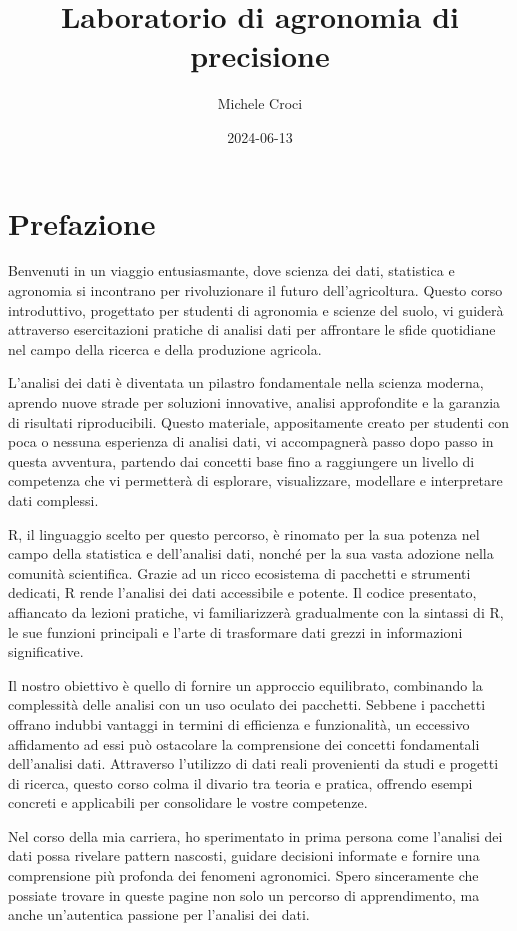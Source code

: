 \documentclass[
]{book}
\title{Laboratorio di agronomia di precisione}
\author{Michele Croci}
\date{2024-06-13}
\begin{document}
\frontmatter
\maketitle

\mainmatter
\hypertarget{prefazione}{%
\chapter{Prefazione}\label{prefazione}}

Benvenuti in un viaggio entusiasmante, dove scienza dei dati, statistica
e agronomia si incontrano per rivoluzionare il futuro dell'agricoltura.
Questo corso introduttivo, progettato per studenti di agronomia e
scienze del suolo, vi guiderà attraverso esercitazioni pratiche di
analisi dati per affrontare le sfide quotidiane nel campo della ricerca
e della produzione agricola.

L'analisi dei dati è diventata un pilastro fondamentale nella scienza
moderna, aprendo nuove strade per soluzioni innovative, analisi
approfondite e la garanzia di risultati riproducibili. Questo materiale,
appositamente creato per studenti con poca o nessuna esperienza di
analisi dati, vi accompagnerà passo dopo passo in questa avventura,
partendo dai concetti base fino a raggiungere un livello di competenza
che vi permetterà di esplorare, visualizzare, modellare e interpretare
dati complessi.

R, il linguaggio scelto per questo percorso, è rinomato per la sua
potenza nel campo della statistica e dell'analisi dati, nonché per la
sua vasta adozione nella comunità scientifica. Grazie ad un ricco
ecosistema di pacchetti e strumenti dedicati, R rende l'analisi dei dati
accessibile e potente. Il codice presentato, affiancato da lezioni
pratiche, vi familiarizzerà gradualmente con la sintassi di R, le sue
funzioni principali e l'arte di trasformare dati grezzi in informazioni
significative.

Il nostro obiettivo è quello di fornire un approccio equilibrato,
combinando la complessità delle analisi con un uso oculato dei
pacchetti. Sebbene i pacchetti offrano indubbi vantaggi in termini di
efficienza e funzionalità, un eccessivo affidamento ad essi può
ostacolare la comprensione dei concetti fondamentali dell'analisi dati.
Attraverso l'utilizzo di dati reali provenienti da studi e progetti di
ricerca, questo corso colma il divario tra teoria e pratica, offrendo
esempi concreti e applicabili per consolidare le vostre competenze.

Nel corso della mia carriera, ho sperimentato in prima persona come
l'analisi dei dati possa rivelare pattern nascosti, guidare decisioni
informate e fornire una comprensione più profonda dei fenomeni
agronomici. Spero sinceramente che possiate trovare in queste pagine non
solo un percorso di apprendimento, ma anche un'autentica passione per
l'analisi dei dati.
\end{document}
